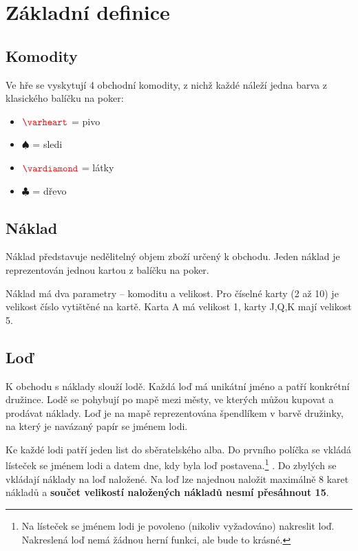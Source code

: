 \documentclass[a4paper, 12pt, twoside]{article}
\newcommand{\cheart}[1]{$#1\color{red}\varheart$}
\newcommand{\cdiamond}[1]{$#1\color{red}\vardiamond$}
\newcommand{\cclub}[1]{$#1\clubsuit$}
\newcommand{\cspade}[1]{$#1\spadesuit$}
\begin{document}
\section{Základní definice}

\subsection{Komodity}

Ve hře se vyskytují 4 obchodní komodity, z nichž každé náleží jedna barva z klasického balíčku na poker:

\begin{itemize}
    \item \cheart{} = pivo
    \item \cspade{} = sledi
    \item \cdiamond{} = látky
    \item \cclub{} = dřevo
\end{itemize}

\subsection{Náklad}

Náklad představuje nedělitelný objem zboží určený k obchodu.  Jeden náklad je reprezentován jednou kartou z balíčku na poker.

Náklad má dva parametry -- komoditu a velikost.  Pro číselné karty (2 až 10) je velikost číslo vytištěné na kartě.  Karta A má velikost 1,
karty J,Q,K mají velikost 5.

\subsection{Loď}

K obchodu s náklady slouží lodě.  Každá loď má unikátní jméno a patří konkrétní družince.  Lodě se pohybují po mapě mezi městy, ve kterých můžou kupovat a 
prodávat náklady.  Loď je na mapě reprezentována špendlíkem v barvě družinky, na který je navázaný papír se jménem lodi.

Ke každé lodi patří jeden list do sběratelského alba.  Do prvního políčka se vkládá lísteček se jménem 
lodi a datem dne, kdy byla loď postavena.\footnote{Na lísteček se jménem lodi je povoleno (nikoliv vyžadováno) nakreslit loď.  Nakreslená loď nemá žádnou herní funkci, ale bude to krásné.}
.  Do zbylých se vkládají náklady na loď
naložené.  Na loď lze najednou naložit maximálně 8 karet nákladů a \textbf{součet velikostí naložených nákladů nesmí přesáhnout 15}.
\end{document}
